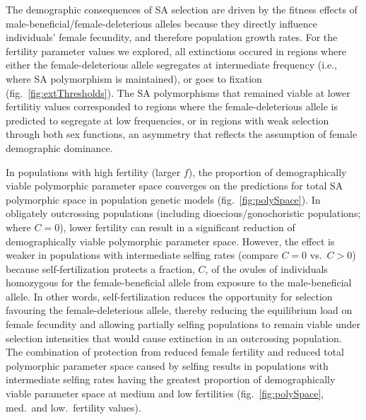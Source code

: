 \documentclass[11pt,draft]{article}
\begin{document}
The demographic consequences of SA selection are driven by the fitness effects of male-beneficial/female-deleterious alleles because they directly influence individuals' female fecundity, and therefore population growth rates. For the fertility parameter values we explored, all extinctions occured in regions where either the female-deleterious allele segregates at intermediate frequency (i.e., where SA polymorphism is maintained), or goes to fixation (fig.~\ref{fig:extThresholds}). The SA polymorphisms that remained viable at lower fertilitiy values corresponded to regions where the female-deleterious allele is predicted to segregate at low frequencies, or in regions with weak selection through both sex functions, an asymmetry that reflects the assumption of female demographic dominance.

In populations with high fertility (larger $f$), the proportion of demographically viable polymorphic parameter space converges on the predictions for total SA polymorphic space in population genetic models (fig.~\ref{fig:polySpace}). In obligately outcrossing populations (including dioecious/gonochoristic populations; where $C = 0$), lower fertility can result in a significant reduction of demographically viable polymorphic parameter space. However, the effect is weaker in populations with intermediate selfing rates (compare $C=0$ vs.~$C > 0$) because self-fertilization protects a fraction, $C$, of the ovules of individuals homozygous for the female-beneficial allele from exposure to the male-beneficial allele. In other words, self-fertilization reduces the opportunity for selection favouring the female-deleterious allele, thereby reducing the equilibrium load on female fecundity and allowing partially selfing populations to remain viable under selection intensities that would cause extinction in an outcrossing population. The combination of protection from reduced female fertility and reduced total polymorphic parameter space caused by selfing results in populations with intermediate selfing rates having the greatest proportion of demographically viable parameter space at medium and low fertilities (fig.~\ref{fig:polySpace}, med.~and low.~fertility values).
\end{document}
